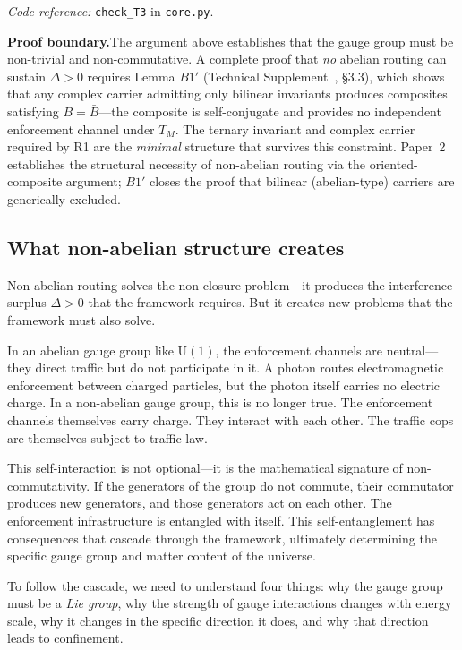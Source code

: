 \documentclass[11pt]{article}
\newcommand{\coderef}[2]{\smallskip\noindent\textit{Code reference:} \texttt{#1} in \texttt{#2}.}
\newcommand{\U}{\mathrm{U}}
\begin{document}
\coderef{check\_T3}{core.py}

\smallskip
\noindent\textbf{Proof boundary.}\quad The argument above establishes that the gauge group must be non-trivial and non-commutative.  A complete proof that \emph{no} abelian routing can sustain $\Delta > 0$ requires Lemma $B1'$ (Technical Supplement~\cite{BrookeP2Supplement}, \S3.3), which shows that any complex carrier admitting only bilinear invariants produces composites satisfying $B = \bar{B}$---the composite is self-conjugate and provides no independent enforcement channel under $T_M$.  The ternary invariant and complex carrier required by R1 are the \emph{minimal} structure that survives this constraint.  Paper~2 establishes the structural necessity of non-abelian routing via the oriented-composite argument; $B1'$ closes the proof that bilinear (abelian-type) carriers are generically excluded.


\subsection{What non-abelian structure creates}

Non-abelian routing solves the non-closure problem---it produces the interference surplus $\Delta > 0$ that the framework requires.  But it creates new problems that the framework must also solve.

In an abelian gauge group like $\U(1)$, the enforcement channels are neutral---they direct traffic but do not participate in it.  A photon routes electromagnetic enforcement between charged particles, but the photon itself carries no electric charge.  In a non-abelian gauge group, this is no longer true.  The enforcement channels themselves carry charge.  They interact with each other.  The traffic cops are themselves subject to traffic law.

This self-interaction is not optional---it is the mathematical signature of non-commutativity.  If the generators of the group do not commute, their commutator produces new generators, and those generators act on each other.  The enforcement infrastructure is entangled with itself.  This self-entanglement has consequences that cascade through the framework, ultimately determining the specific gauge group and matter content of the universe.

To follow the cascade, we need to understand four things: why the gauge group must be a \emph{Lie group}, why the strength of gauge interactions changes with energy scale, why it changes in the specific direction it does, and why that direction leads to confinement.
\end{document}
